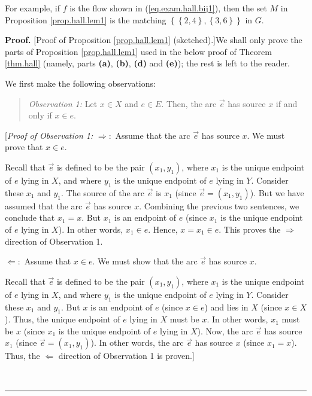 \documentclass[numbers=enddot,12pt,final,onecolumn,notitlepage]{scrartcl}%
\theoremstyle{definition}
\newenvironment{statement}{\begin{quote}}{\end{quote}}
\newenvironment{proof}[1][Proof]{\noindent\textbf{#1.} }{\ \rule{0.5em}{0.5em}}
\begin{document}
For example, if $f$ is the flow shown in (\ref{eq.exam.hall.bij1}), then the
set $M$ in Proposition \ref{prop.hall.lem1} is the matching $\left\{  \left\{
2,4\right\}  ,\left\{  3,6\right\}  \right\}  $ in $G$.

\begin{proof}
[Proof of Proposition \ref{prop.hall.lem1} (sketched).]We shall only prove the
parts of Proposition \ref{prop.hall.lem1} used in the below proof of Theorem
\ref{thm.hall} (namely, parts \textbf{(a)}, \textbf{(b)}, \textbf{(d)} and
\textbf{(e)}); the rest is left to the reader.

We first make the following observations:

\begin{statement}
\textit{Observation 1:} Let $x\in X$ and $e\in E$. Then, the arc
$\overrightarrow{e}$ has source $x$ if and only if $x\in e$.
\end{statement}

[\textit{Proof of Observation 1:} $\Longrightarrow:$ Assume that the arc
$\overrightarrow{e}$ has source $x$. We must prove that $x\in e$.

Recall that $\overrightarrow{e}$ is defined to be the pair $\left(
x_{1},y_{1}\right)  $, where $x_{1}$ is the unique endpoint of $e$ lying in
$X$, and where $y_{1}$ is the unique endpoint of $e$ lying in $Y$. Consider
these $x_{1}$ and $y_{1}$. The source of the arc $\overrightarrow{e}$ is
$x_{1}$ (since $\overrightarrow{e}=\left(  x_{1},y_{1}\right)  $). But we have
assumed that the arc $\overrightarrow{e}$ has source $x$. Combining the
previous two sentences, we conclude that $x_{1}=x$. But $x_{1}$ is an endpoint
of $e$ (since $x_{1}$ is the unique endpoint of $e$ lying in $X$). In other
words, $x_{1}\in e$. Hence, $x=x_{1}\in e$. This proves the $\Longrightarrow$
direction of Observation 1.

$\Longleftarrow:$ Assume that $x\in e$. We must show that the arc
$\overrightarrow{e}$ has source $x$.

Recall that $\overrightarrow{e}$ is defined to be the pair $\left(
x_{1},y_{1}\right)  $, where $x_{1}$ is the unique endpoint of $e$ lying in
$X$, and where $y_{1}$ is the unique endpoint of $e$ lying in $Y$. Consider
these $x_{1}$ and $y_{1}$. But $x$ is an endpoint of $e$ (since $x\in e$) and
lies in $X$ (since $x\in X$). Thus, the unique endpoint of $e$ lying in $X$
must be $x$. In other words, $x_{1}$ must be $x$ (since $x_{1}$ is the unique
endpoint of $e$ lying in $X$). Now, the arc $\overrightarrow{e}$ has source
$x_{1}$ (since $\overrightarrow{e}=\left(  x_{1},y_{1}\right)  $). In other
words, the arc $\overrightarrow{e}$ has source $x$ (since $x_{1}=x$). Thus,
the $\Longleftarrow$ direction of Observation 1 is proven.]


\end{proof}
\end{document}
